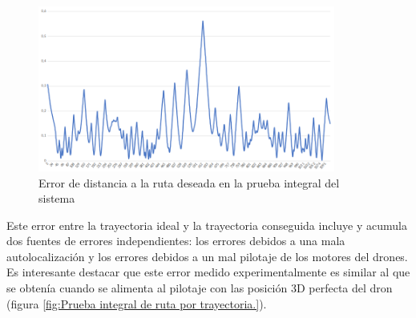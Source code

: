 \begin{figure}[H]
	\begin{center}
		\includegraphics[width=0.87\textwidth]{imag/IMG44.png}
				\caption{Error de distancia a la ruta deseada en la prueba integral del sistema}
		\label{fig:Error de distancia final.}	
	\end{center}
\end{figure}

\hspace{1cm} Este error entre la trayectoria ideal y la trayectoria conseguida incluye y acumula dos fuentes de errores independientes: los errores debidos a una mala autolocalización y los errores debidos a un mal pilotaje de los motores del drones. Es interesante destacar que este error medido experimentalmente es similar al que se obtenía cuando se alimenta al pilotaje con las posición 3D perfecta del dron (figura \ref{fig:Prueba integral de ruta por trayectoria.}).